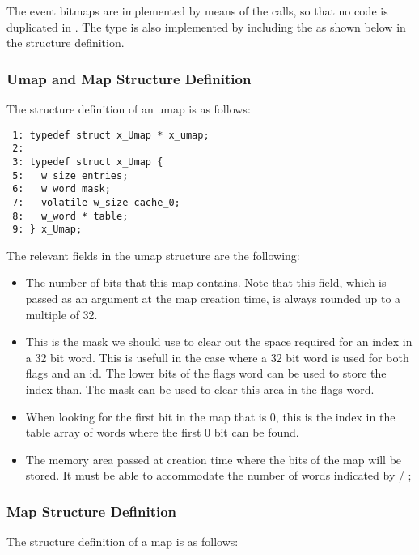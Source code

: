 The  event bitmaps are implemented by means of the
 calls, so that no code is duplicated in \oswald. The
 type is also implemented by including the  as
shown below in the structure definition.

\subsubsection{Umap and Map Structure Definition}

The structure definition of an umap is as follows:

\bcode
\begin{verbatim}
 1: typedef struct x_Umap * x_umap;
 2:
 3: typedef struct x_Umap {
 5:   w_size entries;
 6:   w_word mask;
 7:   volatile w_size cache_0;
 8:   w_word * table;
 9: } x_Umap;
\end{verbatim}
\ecode

The relevant fields in the umap structure are the following:

\begin{itemize}
\item {} The number of bits that this map
contains. Note that this field, which is passed as an argument at the map
creation time, is always rounded up to a multiple of 32.
\item {} This is the mask we should use to
clear out the space required for an index in a 32 bit word. This is usefull
in the case where a 32 bit word is used for both flags and an id. The lower
bits of the flags word can be used to store the index than. The mask can be
used to clear this area in the flags word.
\item {} When looking for the first bit in
the map that is 0, this is the index in the table array of words where the
first 0 bit can be found.
\item {} The memory area passed at creation
time where the bits of the map will be stored. It must be able to accommodate
the number of words indicated by  /
;
\end{itemize}

\subsubsection{Map Structure Definition}

The structure definition of a map is as follows:

